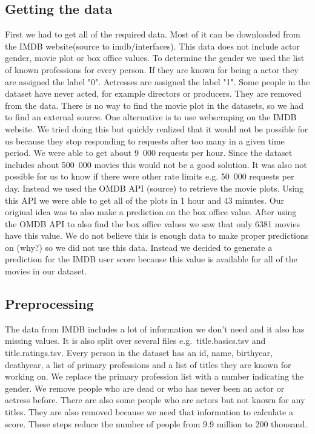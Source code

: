 \subsection{Getting the data} 
First we had to get all of the required data. Most of it can be downloaded from the IMDB website(source to imdb/interfaces). This data does not include actor gender, movie plot or box office values. To determine the gender we used the list of known professions for every person. If they are known for being a actor they are assigned the label "0". Actresses are assigned the label "1". Some people in the dataset have never acted, for example directors or producers. They are removed from the data. There is no way to find the movie plot in the datasets, so we had to find an external source. One alternative is to use webscraping on the IMDB website. We tried doing this but quickly realized that it would not be possible for us because they stop responding to requests after too many in a given time period. We were able to get about 9~000 requests per hour. Since the dataset includes about 500~000 movies this would not be a good solution. It was also not possible for us to know if there were other rate limits e.g. 50~000 requests per day. Instead we used the OMDB API (source) to retrieve the movie plots. Using this API we were able to get all of the plots in 1 hour and 43 minutes. Our original idea was to also make a prediction on the box office value. After using the OMDB API to also find the box office values we saw that only 6381 movies have this value. We do not believe this is enough data to make proper predictions on (why?) so we did not use this data. Instead we decided to generate a prediction for the IMDB user score because this value is available for all of the movies in our dataset.

\subsection{Preprocessing}
The data from IMDB includes a lot of information we don't need and it also has missing values. It is also split over several files e.g.~title.basics.tsv and title.ratings.tsv. Every person in the dataset has an id, name, birthyear, deathyear, a list of primary professions and a list of titles they are known for working on. We replace the primary profession list with a number indicating the gender. We remove people who are dead or who has never been an actor or actress before. There are also some people who are actors but not known for any titles. They are also removed because we need that information to calculate a score. These steps reduce the number of people from 9.9 million to 200 thousand.

